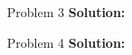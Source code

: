 \normalfont\documentclass[letterpaper,11pt]{article}
\begin{document}
\begin{enumerate}
\item [Problem 3]\textbf{Solution:}\par
\item [Problem 4]\textbf{Solution:}\par
\end{enumerate}
\end{document}
